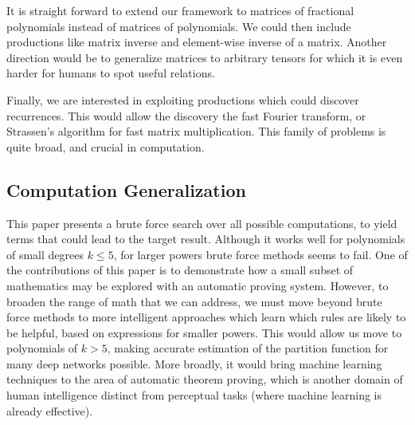 It is straight forward to extend our framework to matrices of fractional
polynomials instead of matrices of polynomials.  We could
then include productions like matrix inverse and element-wise inverse of
a matrix.  Another direction would be to generalize matrices to arbitrary tensors
for which it is even harder for humans to spot useful relations.

Finally, we are interested in exploiting productions which could discover 
recurrences. This would allow the discovery the fast Fourier transform, or
Strassen's algorithm for fast matrix multiplication. This family of problems is quite broad,
and crucial in computation.


\subsection{Computation Generalization}\label{agenda}

This paper presents a brute force search over all possible computations, 
to yield terms that could lead to the target result. Although it works
well for polynomials of small degrees $k \leq 5$, for larger powers 
brute force methods seems to fail. One of the contributions of this paper is to
demonstrate how a small subset of mathematics may be explored with an automatic proving
system. However, to broaden the range of math that we can address, we
must move beyond brute force methods to more intelligent approaches
which learn which rules are likely to be helpful, based on expressions
for smaller powers. This would allow us move to polynomials of $k>5$,
making accurate estimation of the partition function for many deep
networks possible. More broadly, it would bring machine learning techniques
to the area of automatic theorem proving, which is another domain of
human intelligence distinct from perceptual tasks (where machine
learning is already effective). 




